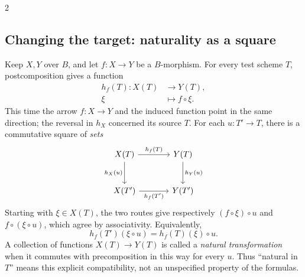 \documentclass[12pt]{memoir}
\begin{document}
\begin{multicols}{2}
\subsection{Changing the target: naturality as a square}
Keep $X,Y$ over $B$, and let $f:X\to Y$ be a $B$-morphism.
For every test scheme $T$, postcomposition gives a function
\[
\begin{aligned}
 h_f(T):X(T)&\longrightarrow Y(T),\\
 \xi&\longmapsto f\circ\xi.
\end{aligned}
\]
This time the arrow $f:X\to Y$ and the induced function point in
the same direction; the reversal in $h_X$ concerned its source $T$.
For each $u:T'\to T$, there is a commutative square of \emph{sets}
\[
\begin{tikzcd}[column sep=large,row sep=large]
X(T) \arrow[r,"h_f(T)"] \arrow[d,"h_X(u)"']
 &Y(T) \arrow[d,"h_Y(u)"]\\
X(T') \arrow[r,"h_f(T')"'] &Y(T')
\end{tikzcd}
\]
Starting with $\xi\in X(T)$, the two routes give respectively
$(f\circ\xi)\circ u$ and $f\circ(\xi\circ u)$, which agree by
associativity. Equivalently,
\[
 h_f(T')(\xi\circ u)=h_f(T)(\xi)\circ u.
\]
A collection of functions $X(T)\to Y(T)$ is called a
\emph{natural transformation} when it commutes with precomposition
in this way for every $u$. Thus ``natural in $T$'' means this
explicit compatibility, not an unspecified property of the formulas.


\end{multicols}
\end{document}

